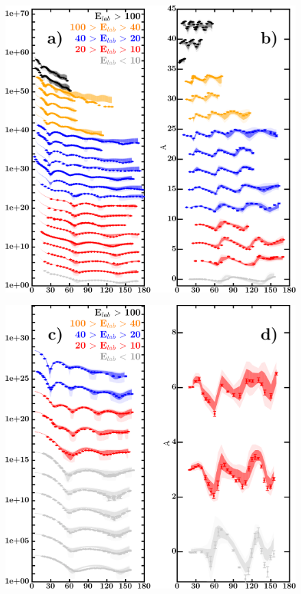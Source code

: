 \documentclass[twocolumn,secnumarabic,amssymb, nobibnotes, aps, prl,
superscriptaddress, nobalancelastpage, draft]{revtex4}
\begin{document}
\begin{figure}[!htb]
    \centering
    \begin{minipage}{0.4\linewidth}
        \centering
        \includegraphics[width=\linewidth]{figures/ni58_protonElastic.png}
        \label{DOM_ni58_proton_elastic}
    \end{minipage}\hspace{6pt}
    \begin{minipage}{0.4\linewidth}
        \centering
        \includegraphics[width=\linewidth]{figures/ni58_neutronElastic.png}

\end{minipage}
\end{figure}
\end{document}
